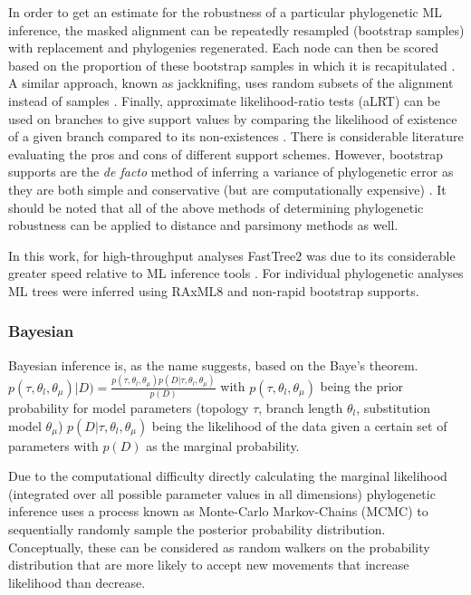 In order to get an estimate for the robustness of a particular phylogenetic ML
inference, the masked alignment can be repeatedly resampled (bootstrap samples)
with replacement and phylogenies regenerated.  Each node can then be scored
based on the proportion of these bootstrap samples in which it is recapitulated \citep{Felsenstein1985}. 
A similar approach, known as jackknifing,
uses random subsets of the alignment instead of samples \citep{Miller1974,Lapointe1994}.
Finally, approximate likelihood-ratio tests (aLRT) can be used on branches
to give support values by comparing the likelihood of existence of a given
branch compared to its non-existences \citep{Anisimova2006}.
There is considerable literature evaluating the pros and cons
 of different support schemes. However, bootstrap supports are the 
 \textit{de facto} method of inferring a variance of 
phylogenetic error \citep{Stamatakis2008} as they are both simple and conservative (but are 
computationally expensive) \citep{Anisimova2006}.  
It should be noted that all of the above methods of determining phylogenetic robustness
can be applied to distance and parsimony methods as well.

In this work, for high-throughput analyses FastTree2 was due to its considerable 
greater speed relative to ML inference tools \citep{Price2010}.  For individual
phylogenetic analyses ML trees were inferred using RAxML8 \citep{Stamatakis2014} and non-rapid
bootstrap supports.

\subsubsection{Bayesian}

Bayesian inference is, as the name suggests, based on the Baye's theorem.
\(p(\tau, \theta_l, \theta_\mu)| D) = \frac{p(\tau, \theta_l, \theta_\mu)p(D|\tau, \theta_l, \theta_\mu)}{p(D)}\)
with \(p(\tau, \theta_l, \theta_\mu)\)
being the prior probability for model parameters (topology \(\tau\), branch length \(\theta_l\), substitution model \(\theta_\mu\))
\(p(D|\tau, \theta_l, \theta_\mu)\)
being the likelihood of the data given a certain set of parameters with \(p(D)\) as the marginal 
probability.

Due to the computational difficulty directly calculating the marginal likelihood 
(integrated over all possible parameter values in all dimensions) phylogenetic inference uses 
a process known as Monte-Carlo Markov-Chains (MCMC) to sequentially randomly sample
the posterior probability distribution.  Conceptually, these can be considered
as random walkers on the probability distribution that are more likely to accept
new movements that increase likelihood than decrease.

